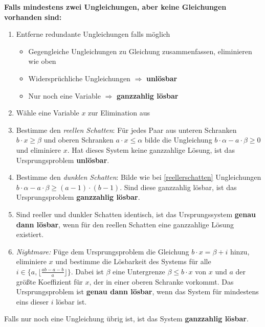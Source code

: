 \documentclass[a4paper,10pt]{article}
\begin{document}
\textbf{Falls mindestens zwei Ungleichungen, aber keine Gleichungen vorhanden sind:}
\vspace*{-0.3em}
\begin{enumerate}
    \item Entferne redundante Ungleichungen falls möglich
        \vspace*{-0.3em}
        \begin{itemize}
            \item Gegengleiche Ungleichungen zu Gleichung zusammenfassen, eliminieren wie oben
            \item Widersprüchliche Ungleichungen $\Rightarrow$ \textbf{unlösbar}
            \item Nur noch eine Variable $\Rightarrow$ \textbf{ganzzahlig lösbar}
        \end{itemize}
    \item Wähle eine Variable $x$ zur Elimination aus
    \item \label{reellerschatten} Bestimme den \textit{reellen Schatten}: Für jedes Paar aus unteren Schranken $b\cdot x\geq\beta$ und oberen Schranken $a\cdot x\leq\alpha$ bilde die Ungleichung $b\cdot \alpha-a\cdot \beta\geq0$ und eliminiere $x$. Hat dieses System keine ganzzahlige Lösung, ist das Ursprungsproblem \textbf{unlösbar}.
    \item Bestimme den \textit{dunklen Schatten}: Bilde wie bei \ref{reellerschatten} Ungleichungen $b\cdot \alpha-a\cdot\beta\geq(a-1)\cdot(b-1)$. Sind diese ganzzahlig lösbar, ist das Ursprungsproblem \textbf{ganzzahlig lösbar}.
    \item Sind reeller und dunkler Schatten identisch, ist das Ursprungssystem \textbf{genau dann lösbar}, wenn für den reellen Schatten eine ganzzahlige Lösung existiert.
    \item \textit{Nightmare:} Füge dem Ursprungsproblem die Gleichung $b\cdot x=\beta+i$ hinzu, eliminiere $x$ und bestimme die Lösbarkeit des Systems für alle $i\in\{a,\lfloor\frac{ab-a-b}a\rfloor\}$. Dabei ist $\beta$ eine Untergrenze $\beta\leq b\cdot x$ von $x$ und $a$ der größte Koeffizient für $x$, der in einer oberen Schranke vorkommt. Das Ursprungsproblem ist \textbf{genau dann lösbar}, wenn das System für mindestens eins dieser $i$ lösbar ist.
\end{enumerate}

Falls nur noch eine Ungleichung übrig ist, ist das System \textbf{ganzzahlig lösbar}.
\end{document}
